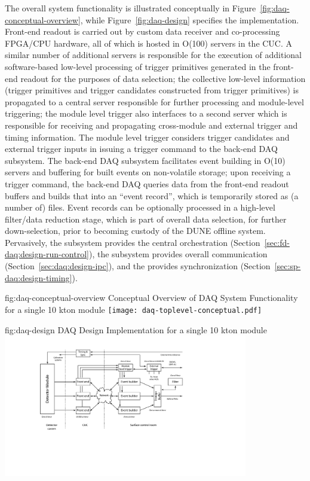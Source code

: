 The overall system functionality is illustrated conceptually in
Figure~\ref{fig:daq-conceptual-overview}, while Figure~\ref{fig:daq-design}
specifies the implementation. Front-end readout is carried out by custom data receiver and
co-processing FPGA/CPU hardware, all of which is hosted in O(100) servers in the CUC. A
similar number of additional servers is responsible for the execution of
additional software-based low-level processing of trigger primitives
generated in the front-end readout for the purposes of data selection; the collective
low-level information (trigger primitives and trigger candidates
constructed from trigger primitives) is propagated to a central server responsible
for further processing and module-level triggering; the module level
trigger also
interfaces to a second server which is responsible for receiving and
propagating cross-module and external trigger and timing
information. The module level trigger considers trigger candidates and
external trigger inputs in issuing a trigger command to the back-end DAQ
subsystem. The back-end DAQ subsystem 
facilitates event building in O(10) servers and buffering for built
events on non-volatile storage; upon receiving a trigger command, the back-end DAQ queries
data from the front-end readout buffers and builds that into an ``event
record'', which is temporarily stored as (a number of) files. Event records can be optionally processed in a high-level
filter/data reduction stage, which is part of overall data selection, for
further down-selection, prior to becoming custody of the DUNE offline
system. Pervasively, the   subsystem provides the central orchestration (Section~\ref{sec:fd-daq:design-run-control}), the  subsystem provides overall communication (Section~\ref{sec:daq:design-ipc}), and the  provides synchronization (Section~\ref{sec:sp-daq:design-timing}).

\begin{dunefigure}{fig:daq-conceptual-overview}{ Conceptual
   Overview of DAQ System Functionality for a single 10 kton module}
  \texttt{[image: daq-toplevel-conceptual.pdf]}
\end{dunefigure}

\begin{dunefigure}{fig:daq-design}{ DAQ Design
    Implementation for a single 10 kton module}
  \includegraphics[width=0.8\textwidth]{daq-overview.pdf}
\end{dunefigure}

